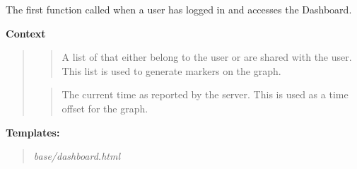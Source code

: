 \documentclass[letterpaper,10pt,english]{sphinxmanual}
\begin{document}

\begin{fulllineitems}
\label{modules/webapp:webapp.views.dashboard}
The first function called when a user has logged in and accesses the Dashboard.

\textbf{Context}
\begin{quote}

\begin{quote}

A list of {\hyperref[modules/microdata:microdata.models.Device]{\emph{}}} that either belong to the user or are shared with the user.
This list is used to generate markers on the graph.
\end{quote}

\begin{quote}

The current time as reported by the server. This is used as a time offset for the graph.
\end{quote}
\end{quote}

\textbf{Templates:}
\begin{quote}

\emph{base/dashboard.html}
\end{quote}

\end{fulllineitems}


\begin{fulllineitems}
\label{modules/webapp:webapp.views.dashboard_update}
\end{fulllineitems}

\end{document}
